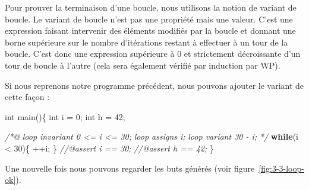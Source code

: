 \documentclass[12pt,francais,]{scrbook}
\newenvironment{Shaded}{}{}
\newcommand{\KeywordTok}[1]{\textcolor[rgb]{0.00,0.44,0.13}{\textbf{{#1}}}}
\newcommand{\DataTypeTok}[1]{\textcolor[rgb]{0.56,0.13,0.00}{{#1}}}
\newcommand{\DecValTok}[1]{\textcolor[rgb]{0.25,0.63,0.44}{{#1}}}
\newcommand{\CommentTok}[1]{\textcolor[rgb]{0.38,0.63,0.69}{\textit{{#1}}}}
\newcommand{\NormalTok}[1]{{#1}}
\begin{document}
Pour prouver la terminaison d'une boucle, nous utilisons la notion de
variant de boucle. Le variant de boucle n'est pas une propriété mais une
valeur. C'est une expression faisant intervenir des éléments modifiés
par la boucle et donnant une borne supérieure sur le nombre d'itérations
restant à effectuer à un tour de la boucle. C'est donc une expression
supérieure à 0 et strictement décroissante d'un tour de boucle à l'autre
(cela sera également vérifié par induction par WP).



Si nous reprenons notre programme précédent, nous pouvons ajouter le
variant de cette façon :

\begin{footnotesize}\begin{Shaded}
\begin{Highlighting}[]
\DataTypeTok{int} \NormalTok{main()\{}
  \DataTypeTok{int} \NormalTok{i = }\DecValTok{0}\NormalTok{;}
  \DataTypeTok{int} \NormalTok{h = }\DecValTok{42}\NormalTok{;}
  
  \CommentTok{/*@}
\CommentTok{    loop invariant 0 <= i <= 30;}
\CommentTok{    loop assigns i;}
\CommentTok{    loop variant 30 - i;}
\CommentTok{  */}
  \KeywordTok{while}\NormalTok{(i < }\DecValTok{30}\NormalTok{)\{}
    \NormalTok{++i;}
  \NormalTok{\}}
  \CommentTok{//@assert i == 30;}
  \CommentTok{//@assert h == 42;}
\NormalTok{\}}
\end{Highlighting}
\end{Shaded}\end{footnotesize}

Une nouvelle fois nous pouvons regarder les buts générés (voir
figure~\ref{fig:3-3-loop-ok}).
\end{document}
